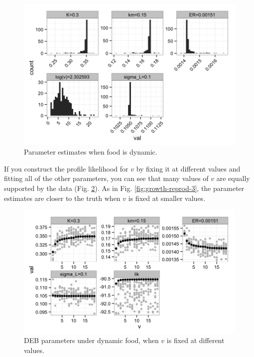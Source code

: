 \documentclass[12pt,reqno,final,pdftex]{amsart}\usepackage[]{graphicx}\usepackage[]{color}
\newenvironment{knitrout}{}{} %
\theoremstyle{plain}
\numberwithin{equation}{part}
\begin{document}
\begin{knitrout}\scriptsize
{}\color{fgcolor}\begin{figure}

\includegraphics[width=\linewidth]{figure/dyn-food-hist-1} \hfill{}

\caption[Parameter estimates when food is dynamic]{Parameter estimates when food is dynamic.}\label{fig:dyn-food-hist}
\end{figure}


\end{knitrout}

If you construct the profile likelihood for $v$ by fixing it at different values and fitting all of the other parameters, you can see that many values of $v$ are equally supported by the data (Fig. \ref{fig:dyn-food-prof-lik-v}).
As in Fig. \ref{fig:growth-reprod-3}, the parameter estimates are closer to the truth when $v$ is fixed at smaller values.
\begin{knitrout}\scriptsize
{}\color{fgcolor}\begin{figure}

\includegraphics[width=\linewidth]{figure/dyn-food-prof-lik-v-1} \hfill{}

\caption[DEB parameters under dynamic food, when ]{DEB parameters under dynamic food, when $v$ is fixed at different values.}\label{fig:dyn-food-prof-lik-v}
\end{figure}


\end{knitrout}
\end{document}
